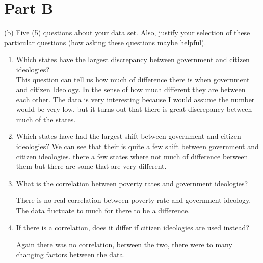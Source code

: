 \documentclass[11pt]{article}
\begin{document}
\section{Part B}
(b) Five (5) questions about your data set. Also, justify your selection of these particular questions (how asking these questions maybe helpful).\\




\begin{enumerate}
\item Which states have the largest discrepancy between government and citizen ideologies?\\
This  question can tell us how much of difference there is when government and citizen Ideology. In the sense of how much different they are between each other. The data is very interesting because I would assume the number would be very low, but it turns out that there is great discrepancy between much of the states. 




\item Which states have had the largest shift between government and citizen ideologies?
We can see that their is quite a few shift between government and citizen ideologies. there a few states where not much of difference between them but there are some that are very different. 



\item What is the correlation between poverty rates and government ideologies?

There is no real correlation between poverty rate and government ideology. The data fluctuate to much for there to be a difference.  


\item If there is a correlation, does it differ if citizen ideologies are used instead?

Again there was no correlation, between the two, there were to many changing factors between the data. 

\end{enumerate}
\end{document}
